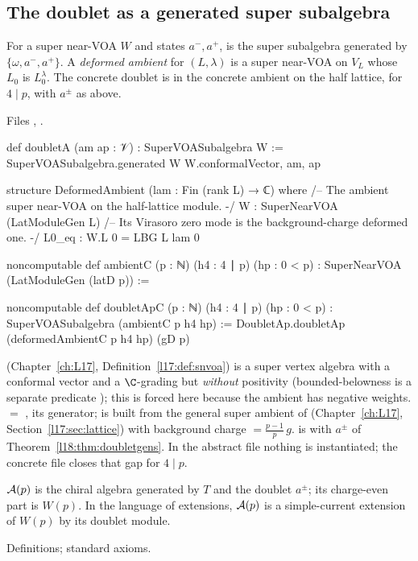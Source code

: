 \subsection{The doublet as a generated super subalgebra}

\begin{definition}\label{l18:def:doublet}
For a super near-VOA $W$ and states $a^-,a^+$,  is the super subalgebra generated by
$\{\omega,a^-,a^+\}$. A \emph{deformed ambient} for $(L,\lambda)$ is a super near-VOA on $V_L$ whose $L_0$ is $L^\lambda_0$.
The concrete doublet  is  in the concrete ambient  on the
half lattice, for $4\mid p$, with $a^\pm$ as above.
\end{definition}
\noindent Files ,
.
\begin{leancode}
def doubletA (am ap : 𝒱) : SuperVOASubalgebra W :=
  SuperVOASubalgebra.generated W {W.conformalVector, am, ap}

structure DeformedAmbient (lam : Fin (rank L) → ℂ) where
  /-- The ambient super near-VOA on the half-lattice module. -/
  W : SuperNearVOA (LatModuleGen L)
  /-- Its Virasoro zero mode is the background-charge deformed one. -/
  L0_eq : W.L 0 = LBG L lam 0
\end{leancode}
\begin{leancode}
noncomputable def ambientC (p : ℕ) (h4 : 4 ∣ p) (hp : 0 < p) :
    SuperNearVOA (LatModuleGen (latD p)) :=

noncomputable def doubletApC (p : ℕ) (h4 : 4 ∣ p) (hp : 0 < p) :
    SuperVOASubalgebra (ambientC p h4 hp) :=
  DoubletAp.doubletAp (deformedAmbientC p h4 hp) (gD p)
\end{leancode}
\begin{dictionary}
 (Chapter~\ref{ch:L17}, Definition~\ref{l17:def:snvoa}) is a super vertex algebra with a conformal
vector and a $\C$-grading but \emph{without} positivity (bounded-belowness is a separate predicate
); this is forced here because the ambient has negative weights.  $=$
,  its generator;  is built from the general super ambient of
 (Chapter~\ref{ch:L17}, Section~\ref{l17:sec:lattice}) with background charge
 $=\frac{p-1}p\,g$.  is  with $a^\pm$ of
Theorem~\ref{l18:thm:doubletgens}. In the abstract file  nothing is instantiated; the concrete
file closes that gap for $4\mid p$.
\end{dictionary}
\begin{physics}
$\mathcal{A}(p)$ is the chiral algebra generated by $T$ and the doublet $a^\pm$; its charge-even part is $W(p)$. In
the language of extensions, $\mathcal{A}(p)$ is a simple-current extension of $W(p)$ by its doublet module.
\end{physics}
\begin{status}
Definitions; standard axioms.
\end{status}

